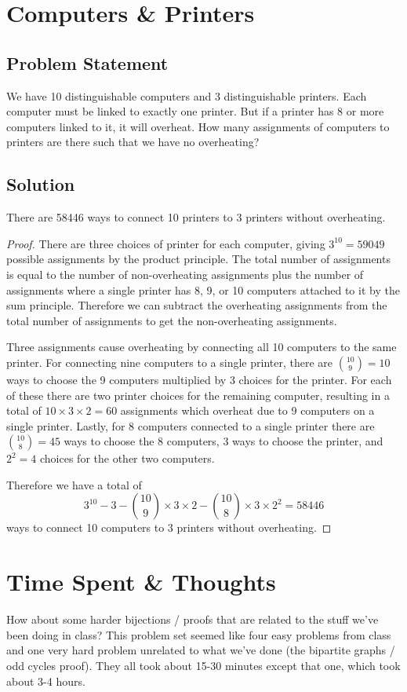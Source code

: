\documentclass[12pt]{article}
\newcommand{\ProblemStatement}[1]{
\subsection*{Problem Statement}
#1
\subsection*{Solution}
}
\begin{document}
\section{Computers \& Printers}
\ProblemStatement{
We have 10 distinguishable computers and 3 distinguishable printers. Each computer must be linked to exactly one printer. But if a printer has 8 or more computers linked to it, it will overheat. How many assignments of computers to printers are there such that we have no overheating?
}
 
There are 58446 ways to connect 10 printers to 3 printers without overheating.

\begin{proof}
There are three choices of printer for each computer, giving $3^{10}=59049$ possible assignments by the product principle. The total number of assignments is equal to the number of non-overheating assignments plus the number of assignments where a single printer has 8, 9, or 10 computers attached to it by the sum principle. Therefore we can subtract the overheating assignments from the total number of assignments to get the non-overheating assignments.

Three assignments cause overheating by connecting all 10 computers to the same printer. For connecting nine computers to a single printer, there are $\binom{10}{9} = 10$ ways to choose the 9 computers multiplied by 3 choices for the printer. For each of these there are two printer choices for the remaining computer, resulting in a total of $10 \times 3 \times 2 = 60$ assignments which overheat due to 9 computers on a single printer. Lastly, for 8 computers connected to a single printer there are $\binom{10}{8}=45$ ways to choose the 8 computers, 3 ways to choose the printer, and $2^2=4$ choices for the other two computers. 

Therefore we have a total of 
\[
    3^{10} - 3 - \binom{10}{9}\times3\times2 - \binom{10}{8}\times3\times2^2 = 58446
\]
ways to connect 10 computers to 3 printers without overheating.


\end{proof}


\section{Time Spent \& Thoughts}

How about some harder bijections / proofs that are related to the stuff we've been doing in class? This problem set seemed like four easy problems from class and one very hard problem unrelated to what we've done (the bipartite graphs / odd cycles proof). They all took about 15-30 minutes except that one, which took about 3-4 hours.
\end{document}

